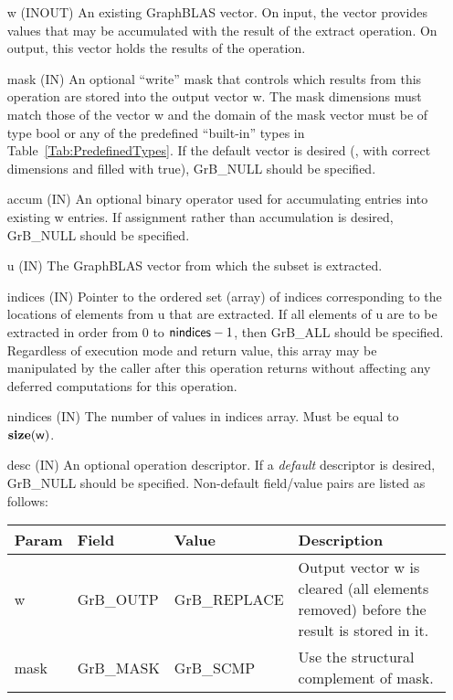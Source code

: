 \begin{itemize}[leftmargin=1.1in]
    \item[{\sf w}]    ({\sf INOUT}) An existing GraphBLAS vector.  On input,
    the vector provides values that may be accumulated with the result of the
    extract operation.  On output, this vector holds the results of the
    operation.

    \item[{\sf mask}] ({\sf IN}) An optional ``write'' mask that controls which
    results from this operation are stored into the output vector {\sf w}. The 
    mask dimensions must match those of the vector {\sf w} and the domain of the
    {\sf mask} vector must be of type {\sf bool} or any of the predefined 
    ``built-in'' types in Table~\ref{Tab:PredefinedTypes}.  If the default
    vector is desired (\ie, with correct dimensions and filled with {\sf true}), 
    {\sf GrB\_NULL} should be specified.

    \item[{\sf accum}] ({\sf IN}) An optional binary operator used for accumulating
    entries into existing {\sf w} entries. If assignment rather than accumulation is
    desired, {\sf GrB\_NULL} should be specified.

    \item[{\sf u}]    ({\sf IN}) The GraphBLAS vector from which the subset
    is extracted.

    \item[{\sf indices}]  ({\sf IN}) Pointer to the ordered set (array) of 
    indices corresponding to the locations of elements from {\sf u} that are 
    extracted.  If all elements of {\sf u} are to be extracted in order from $0$ 
    to ${\sf nindices} - 1$, then {\sf GrB\_ALL} should be specified.  Regardless of 
    execution mode and return value, this array may be manipulated by the caller
    after this operation returns without affecting any deferred computations for 
    this operation.
    
    \item[{\sf nindices}] ({\sf IN}) The number of values in {\sf indices} array.
    Must be equal to $\bold{size}({\sf w})$.

    \item[{\sf desc}] ({\sf IN}) An optional operation descriptor. If
    a \emph{default} descriptor is desired, {\sf GrB\_NULL} should be
    specified. Non-default field/value pairs are listed as follows:  \\

    \begin{tabular}{lllp{2.5in}}
        Param & Field  & Value & Description \\
        \hline
        {\sf w}    & {\sf GrB\_OUTP} & {\sf GrB\_REPLACE} & Output vector {\sf w}
        is cleared (all elements removed) before the result is stored in it.\\

        {\sf mask} & {\sf GrB\_MASK} & {\sf GrB\_SCMP}   & Use the structural
        complement of {\sf mask}. \\
    \end{tabular}
\end{itemize}

